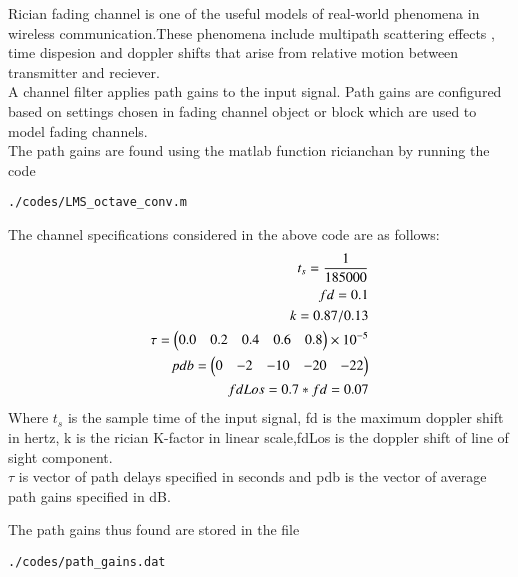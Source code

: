 Rician fading channel is one of the useful models of real-world phenomena in wireless communication.These phenomena include multipath scattering effects , time dispesion and doppler shifts that arise from relative motion between transmitter and reciever.
\\
A channel filter applies path gains to the input signal.
Path gains are configured based on settings chosen in fading channel object or block which are used to model fading channels.
\\
The path gains are found using the matlab function ricianchan by running the code 
\begin{lstlisting}
./codes/LMS_octave_conv.m
\end{lstlisting}
The channel specifications considered in the above code are as follows:
\begin{align}
t_s=\frac{1}{185000}
\\
fd=0.1
\\
k=0.87/0.13
\\
\tau=\begin{pmatrix}0.0& 0.2& 0.4 &0.6 &0.8 \end{pmatrix}\times 10^{-5}
\\
pdb = \begin{pmatrix}0& -2& -10 &-20 & -22\end{pmatrix}
\\
fdLos=0.7*fd=0.07
\end{align}
Where $t_s$ is the sample time of the input signal, fd is the maximum doppler shift in hertz, k is the rician K-factor in linear scale,fdLos is the doppler shift of line of sight component.
\\
$\tau$ is vector of path delays specified in seconds and pdb is the vector of average path gains specified in dB.

The path gains thus found are stored in the file
\begin{lstlisting}
./codes/path_gains.dat
\end{lstlisting}
